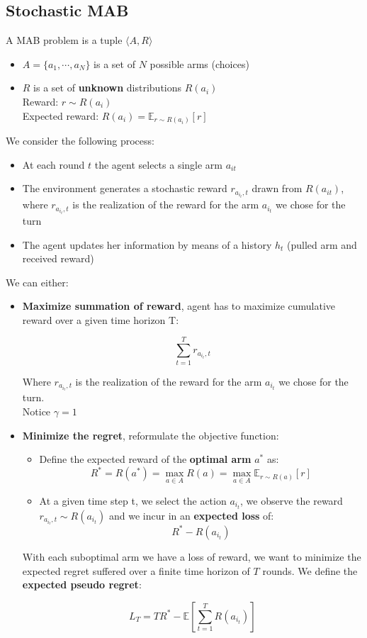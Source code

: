 \subsection{Stochastic MAB}
    A MAB problem is a tuple $\langle A,R\rangle$
    \begin{itemize}
        \item $A=\{a_1,\cdots,a_N\}$ is a set of $N$ possible arms (choices)
        \item $R$ is a set of \textbf{unknown} distributions $R(a_i)$\\
        Reward: $r\sim R(a_i)$\\
        Expected reward: $R(a_i)=\mathbb{E}_{r\sim R(a_i)}[r]$
    \end{itemize}
    We consider the following process:
    \begin{itemize}
        \item At each round $t$ the agent selects a single arm $a_{it}$
        \item The environment generates a stochastic reward $r_{a_{i_t},t}$ drawn from $R(a_{it})$, where $r_{a_{i_t},t}$ is the realization of the reward for the arm $a_{i_t}$ we chose for the turn
        \item The agent updates her information by means of a history $h_t$ (pulled arm and received reward)
    \end{itemize}
    We can either:
    \begin{itemize}
        \item \textbf{Maximize summation of reward}, agent has to maximize cumulative reward over a given time horizon T:
        \begin{LARGE}
            $$\sum_{t=1}^Tr_{a_{i_t},t}$$
        \end{LARGE}
        Where $r_{a_{i_t},t}$ is the realization of the reward for the arm $a_{i_t}$ we chose for the turn.\\
        Notice $\gamma=1$
        \item \textbf{Minimize the regret}, reformulate the objective function:
        \begin{itemize}
            \item Define the expected reward of the \textbf{optimal arm} $a^*$ as:
            $$R^*=R(a^*)=\max_{a\in A}R(a)=\max_{a\in A}\mathbb{E}_{r\sim R(a)}[r]$$
            \item At a given time step t, we select the action $a_{i_t}$, we observe the reward $r_{a_{i_t},t}\sim R(a_{i_t})$ and we incur in an \textbf{expected loss} of:
            $$R^*-R(a_{i_t})$$
        \end{itemize}
        With each suboptimal arm we have a loss of reward, we want to minimize the expected regret suffered over a finite time horizon of $T$ rounds. We define the \textbf{expected pseudo regret}:
        \begin{LARGE}
            $$L_T=TR^*-\mathbb{E}\left[\sum_{t=1}^TR(a_{i_t})\right]$$
        \end{LARGE}
    \end{itemize}

